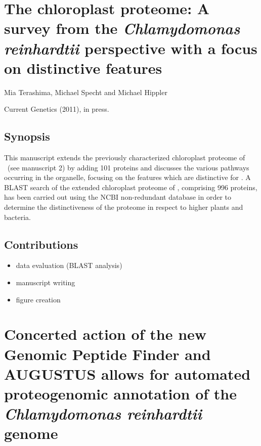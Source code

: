 \section{The chloroplast proteome: A survey from the {\em Chlamydomonas reinhardtii} perspective with a focus on distinctive features}

Mia Terashima, Michael Specht and Michael Hippler

Current Genetics (2011), in press.

\subsection*{Synopsis}

This manuscript extends the previously characterized chloroplast proteome
of \cre~(see manuscript 2) by adding 101 proteins and discusses the various 
pathways occurring in the organelle, focusing on the features which are 
distinctive for \cre.
A BLAST search of the extended chloroplast proteome of \cre, comprising 996
proteins, has been carried out using the NCBI non-redundant database in order
to determine the distinctiveness of the proteome in respect to higher plants
and bacteria.

\subsection*{Contributions}

\begin{itemize}
\item data evaluation (BLAST analysis)
\item manuscript writing
\item figure creation
\end{itemize}

{}

\cleardoublepage
\section{Concerted action of the new Genomic Peptide Finder and AUGUSTUS allows for automated proteogenomic annotation of the {\em Chlamydomonas reinhardtii} genome}

